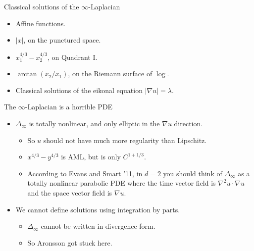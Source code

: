 \documentclass[10pt]{beamer}
\begin{document}
\begin{frame}{Classical solutions of the $\infty$-Laplacian}
\begin{itemize}
\item Affine functions.
\item $|x|$, on the punctured space.
\item $x_1^{4/3} - x_2^{4/3}$, on Quadrant I.
\item $\arctan(x_2/x_1)$, on the Riemann surface of $\log$.
\item Classical solutions of the eikonal equation $|\nabla u| = \lambda$.
\end{itemize}
\end{frame}

\begin{frame}{The $\infty$-Laplacian is a horrible PDE}
\begin{itemize}
\item $\Delta_\infty$ is totally nonlinear, and only elliptic in the $\nabla u$ direction.  
\begin{itemize}
\item So $u$ should not have much more regularity than Lipschitz. 
\item $x^{4/3} - y^{4/3}$ is AML, but is only $C^{1 + 1/3}$. 
\item According to Evans and Smart '11, in $d = 2$ you should think of $\Delta_\infty$ as a totally nonlinear parabolic PDE where the time vector field is $\nabla^2 u \cdot \nabla u$ and the space vector field is $\nabla u$. \pause
\end{itemize}
\item We cannot define solutions using integration by parts. 
\begin{itemize}
\item $\Delta_\infty$ cannot be written in divergence form. 
\item So Aronsson got stuck here.
\end{itemize}
\end{itemize}
\end{frame}
\end{document}
